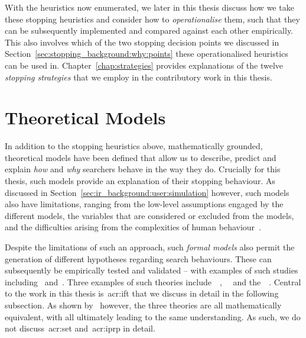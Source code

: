 With the heuristics now enumerated, we later in this thesis discuss how we take these stopping heuristics and consider how to \emph{operationalise} them, such that they can be subsequently implemented and compared against each other empirically. This also involves which of the two stopping decision points we discussed in Section~\ref{sec:stopping_background:why:points} these operationalised heuristics can be used in. Chapter~\ref{chap:strategies} provides explanations of the twelve \emph{stopping strategies} that we employ in the contributory work in this thesis.

\section{Theoretical Models}\label{sec:stopping_background:theoretical}
In addition to the stopping heuristics above, mathematically grounded, theoretical models have been defined that allow us to describe, predict and explain \emph{how} and \emph{why} searchers behave in the way they do. Crucially for this thesis, such models provide an explanation of their stopping behaviour. As discussed in Section~\ref{sec:ir_background:user:simulation} however, such models also have limitations, ranging from the low-level assumptions engaged by the different models, the variables that are considered or excluded from the models, and the difficulties arising from the complexities of human behaviour~\citep{fishwick1995simulation, azzopardi2015theories}.

Despite the limitations of such an approach, such \emph{formal models} also permit the generation of different hypotheses regarding search behaviours. These can subsequently be empirically tested and validated -- with examples of such studies including~\cite{azzopardi2013query_cost} and~\cite{pirolli1996scatter_techniques}. Three examples of such theories include~~\citep{pirolli1999ift},~~\citep{azzopardi2011economics} and the~~\citep{fuhr2008iprp}. Central to the work in this thesis is~\gls{acr:ift} that we discuss in detail in the following subsection. As shown by~\cite{azzopardi2015theories} however, the three theories are all mathematically equivalent, with all ultimately leading to the same understanding. As such, we do not discuss~\gls{acr:set} and~\gls{acr:iprp} in detail.


